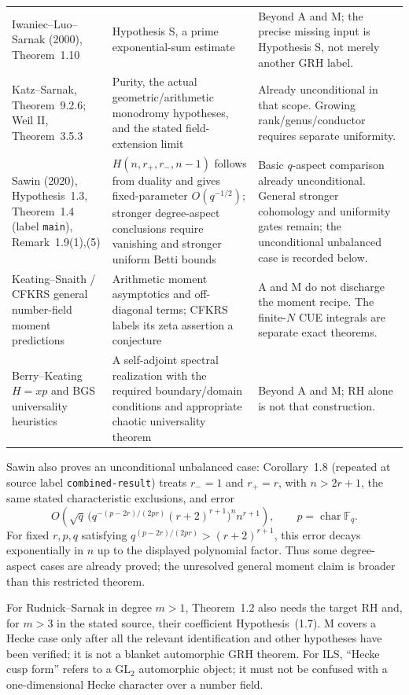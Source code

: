 \documentclass[11pt,a4paper]{article}
\theoremstyle{definition}\newtheorem{definition}{Definition}
\begin{document}
\begin{longtable}{p{}p{}p{}}
Iwaniec--Luo--Sarnak (2000), Theorem~1.10 & Hypothesis S, a prime exponential-sum estimate & Beyond A and M; the precise missing input is Hypothesis S, not merely another GRH label.\\
Katz--Sarnak, Theorem~9.2.6; Weil II, Theorem~3.5.3 & Purity, the actual geometric/arithmetic monodromy hypotheses, and the stated field-extension limit & Already unconditional in that scope. Growing rank/genus/conductor requires separate uniformity.\\
Sawin (2020), Hypothesis~1.3, Theorem~1.4 (label \texttt{main}), Remark~1.9(1),(5) & $H(n,r_+,r_-,n-1)$ follows from duality and gives fixed-parameter $O(q^{-1/2})$; stronger degree-aspect conclusions require vanishing and stronger uniform Betti bounds & Basic $q$-aspect comparison already unconditional. General stronger cohomology and uniformity gates remain; the unconditional unbalanced case is recorded below.\\
Keating--Snaith / CFKRS general number-field moment predictions & Arithmetic moment asymptotics and off-diagonal terms; CFKRS labels its zeta assertion a conjecture & A and M do not discharge the moment recipe. The finite-$N$ CUE integrals are separate exact theorems.\\
Berry--Keating $H=xp$ and BGS universality heuristics & A self-adjoint spectral realization with the required boundary/domain conditions and appropriate chaotic universality theorem & Beyond A and M; RH alone is not that construction.\\\hline
\end{longtable}
\endgroup

Sawin also proves an unconditional unbalanced case: Corollary~1.8 (repeated at source label \texttt{combined-result}) treats $r_-=1$ and $r_+=r$, with $n>2r+1$, the same stated characteristic exclusions, and error
\[
 O\!\left(\sqrt q\,\bigl(q^{-(p-2r)/(2pr)}(r+2)^{r+1}\bigr)^n n^{r+1}\right),
 \qquad p=\operatorname{char}\mathbb F_q.
\]
For fixed $r,p,q$ satisfying $q^{(p-2r)/(2pr)}>(r+2)^{r+1}$, this error decays exponentially in $n$ up to the displayed polynomial factor. Thus some degree-aspect cases are already proved; the unresolved general moment claim is broader than this restricted theorem.

For Rudnick--Sarnak in degree $m>1$, Theorem~1.2 also needs the target RH and, for $m>3$ in the stated source, their coefficient Hypothesis~(1.7). M covers a Hecke case only after all the relevant identification and other hypotheses have been verified; it is not a blanket automorphic GRH theorem. For ILS, ``Hecke cusp form'' refers to a $\mathrm{GL}_2$ automorphic object; it must not be confused with a one-dimensional Hecke character over a number field.
\end{document}
